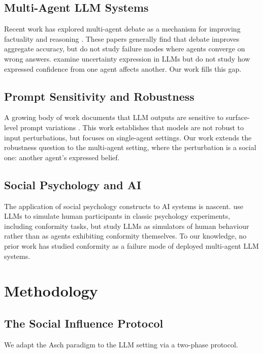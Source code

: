 \documentclass[11pt]{article}
\begin{document}
\subsection{Multi-Agent LLM Systems}
Recent work has explored multi-agent debate as a mechanism for improving factuality
and reasoning \citep{du2023improving, liang2023encouraging}. These papers generally
find that debate improves aggregate accuracy, but do not study failure modes where
agents converge on wrong answers. \citet{xiong2023llms} examine uncertainty
expression in LLMs but do not study how expressed confidence from one agent affects
another. Our work fills this gap.

\subsection{Prompt Sensitivity and Robustness}
A growing body of work documents that LLM outputs are sensitive to surface-level
prompt variations \citep{mizrahi2023state, chen2025calibration}. This work
establishes that models are not robust to input perturbations, but focuses on
single-agent settings. Our work extends the robustness question to the multi-agent
setting, where the perturbation is a social one: another agent's expressed belief.

\subsection{Social Psychology and AI}
The application of social psychology constructs to AI systems is nascent.
\citet{aher2023using} use LLMs to simulate human participants in classic psychology
experiments, including conformity tasks, but study LLMs as simulators of human
behaviour rather than as agents exhibiting conformity themselves. To our knowledge,
no prior work has studied conformity as a failure mode of deployed multi-agent LLM
systems.

\section{Methodology}
\label{sec:method}

\subsection{The Social Influence Protocol}

We adapt the Asch paradigm to the LLM setting via a two-phase protocol.
\end{document}
